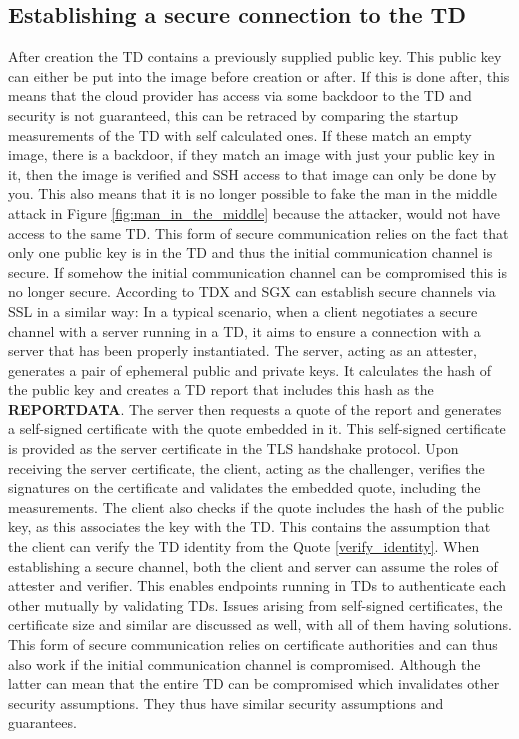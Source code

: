 \subsection{Establishing a secure connection to the TD}
\label{Establishing_a_secure_connection}
After creation the TD contains a previously supplied public key. This public key can either be put into the image before creation or after. If this is done after, this means that the cloud provider has access via some backdoor to the TD and security is not guaranteed, this can be retraced by comparing the startup measurements of the TD with self calculated ones. If these match an empty image, there is a backdoor, if they match an image with just your public key in it, then the image is verified and SSH access to that image can only be done by you. This also means that it is no longer possible to fake the man in the middle attack in Figure \ref{fig:man_in_the_middle} because the attacker, would not have access to the same TD. This form of secure communication relies on the fact that only one public key is in the TD and thus the initial communication channel is secure. If somehow the initial communication channel can be compromised this is no longer secure.
According to \cite{cheng_intel_tdx_demystified_2023} TDX and SGX can establish secure channels via SSL in a similar way:
In a typical scenario, when a client negotiates a secure channel with a server running in a TD, it aims to ensure a connection with a server that has been properly instantiated. The server, acting as an attester, generates a pair of ephemeral public and private keys. It calculates the hash of the public key and creates a TD report that includes this hash as the \textbf{REPORTDATA}. The server then requests a quote of the report and generates a self-signed certificate with the quote embedded in it. This self-signed certificate is provided as the server certificate in the TLS handshake protocol. Upon receiving the server certificate, the client, acting as the challenger, verifies the signatures on the certificate and validates the embedded quote, including the measurements. The client also checks if the quote includes the hash of the public key, as this associates the key with the TD. This contains the assumption that the client can verify the TD identity from the Quote \ref{verify_identity}. When establishing a secure channel, both the client and server can assume the roles of attester and verifier. This enables endpoints running in TDs to authenticate each other mutually by validating TDs\cite{Knauth}. Issues arising from self-signed certificates, the certificate size and similar are discussed as well, with all of them  having solutions. This form of secure communication relies on certificate authorities and can thus also work if the initial communication channel is compromised. Although the latter can mean that the entire TD can be compromised which invalidates other security assumptions. They thus have similar security assumptions and guarantees.

